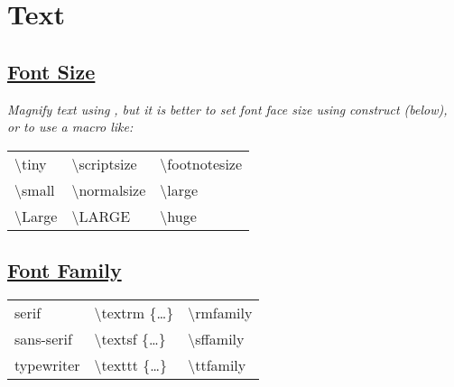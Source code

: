 \section{Text}


\subsection*{\href{https://www.overleaf.com/learn/latex/font\_typefaces}{Font Size}}
\textit{Magnify text using }\textit{, but it is better to set font face size using }\textit{ construct (below), or to use a macro like:}\\
\begin{tabular}{@{}l l l}
    {\tiny \textbackslash tiny}                 &
    {\scriptsize \textbackslash scriptsize}     &
    {\footnotesize \textbackslash footnotesize} \\
    {\small \textbackslash small}               &
    {\normalsize \textbackslash normalsize}     &
    {\large \textbackslash large}               \\
    {\Large \textbackslash Large}               &
    {\LARGE \textbackslash LARGE}               &
    {\huge  \textbackslash huge}                \\
\end{tabular}


\subsection*{\href{https://www.overleaf.com/learn/latex/Font_sizes,_families,_and_styles}{Font Family}}
\begin{tabular}{l l l}
{\rmfamily serif} & \textbackslash textrm \{\dots\} & \textbackslash rmfamily \\
{\sffamily sans-serif} & \textbackslash textsf \{\dots\} & \textbackslash sffamily \\
{\ttfamily typewriter} & \textbackslash texttt \{\dots\} & \textbackslash ttfamily \\
\end{tabular}


